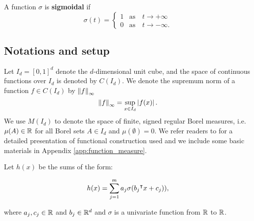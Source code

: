 

\begin{definition}\label{def:sigmoidal}
    A function $\sigma$ is \textbf{sigmoidal} if
    \begin{equation}
        \sigma(t) =
        \begin{cases}
            1 & \text{as} \quad t \to +\infty \\
            0 & \text{as} \quad t \to -\infty.
        \end{cases}
    \end{equation}
\end{definition}

\subsection*{Notations and setup}

Let $I_d = [0,1]^d$ denote the $d$-dimensional unit cube, and the space of
continuous functions over $I_d$ is denoted by $C(I_d)$. We denote the supremum
norm of a function $f \in C(I_d)$ by $\left\| f \right\|_{\infty}$ 
\begin{equation}
    \left\| f \right\|_{\infty} = \sup_{x\in I_d} \left| f(x) \right|.
\end{equation}
We use $M(I_d)$ to denote the space of finite, signed regular Borel measures,
i.e. $\mu(A) \in \mathbb{R}$ for all Borel sets $A \in I_d$ and $\mu(\emptyset)= 0$. We
refer readers to \cite{rudinFunctionalAnalysis1991,
rudinRealComplexAnalysis1987} for a detailed presentation of functional
construction used and we include some basic materials in Appendix
\ref{app:function_measure}.

Let $h(x)$ be the sums of the form:

\begin{equation}
    \label{eq:sum_sigma}
    h(x) = \sum_{j=1}^m a_j \sigma(b_j{}^{\intercal} x + c_j)),
\end{equation}

where $a_j, c_j \in \mathbb{R}$ and $b_j \in \mathbb{R}^d$ and $\sigma$ is a univariate function
from $\mathbb{R}$ to $\mathbb{R}$.
 
